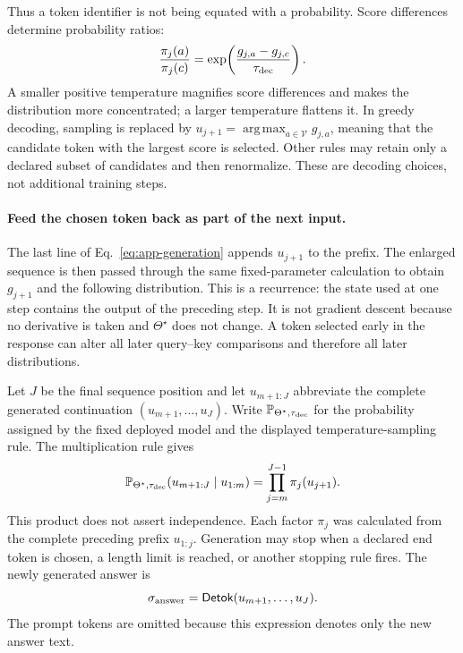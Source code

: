 \documentclass[
  aps,
  reprint,
  superscriptaddress,
  floatfix,
  nofootinbib,
  longbibliography
]{revtex4-2}
\newcommand{\Prob}{\mathbb{P}}
\DeclareMathOperator*{\argmax}{arg\,max}
\begin{document}
Thus a token identifier is not being equated with a probability.  Score
differences determine probability ratios:
\begin{equation}
\label{eq:app-temperature-ratio}
\frac{\pi_j(a)}{\pi_j(c)}
=\exp\!\left(
\frac{g_{j,a}-g_{j,c}}{\tau_{\rm dec}}
\right).
\end{equation}
A smaller positive temperature magnifies score differences and makes the
distribution more concentrated; a larger temperature flattens it.  In greedy
decoding, sampling is replaced by
$u_{j+1}=\argmax_{a\in\mathcal V}g_{j,a}$, meaning that the candidate token with
the largest score is selected.  Other rules may retain only a
declared subset of candidates and then renormalize.  These are decoding choices,
not additional training steps.

\paragraph{Feed the chosen token back as part of the next input.}
The last line of Eq.~\eqref{eq:app-generation} appends $u_{j+1}$ to the prefix.
The enlarged sequence is then passed through the same fixed-parameter
calculation to obtain $g_{j+1}$ and the following distribution.  This is a
recurrence: the state used at one step contains the output of the preceding
step.  It is not gradient descent because no derivative is taken and
$\Theta^\star$ does not change.  A token selected early in the response can
alter all later query--key comparisons and therefore all later distributions.

Let $J$ be the final sequence position and let $u_{m+1:J}$ abbreviate the
complete generated continuation $(u_{m+1},\ldots,u_J)$.  Write
$\Prob_{\Theta^\star,\tau_{\rm dec}}$ for the probability assigned by the fixed
deployed model and the displayed temperature-sampling rule.  The multiplication
rule gives
\begin{equation}
\label{eq:app-generation-chain}
\Prob_{\Theta^\star,\tau_{\rm dec}}
(u_{m+1:J}\mid u_{1:m})
=\prod_{j=m}^{J-1}\pi_j(u_{j+1}).
\end{equation}
This product does not assert independence.  Each factor $\pi_j$ was calculated
from the complete preceding prefix $u_{1:j}$.  Generation may stop when a
declared end token is chosen, a length limit is reached, or another stopping
rule fires.  The newly generated answer is
\begin{equation}
\label{eq:app-detokenization}
\sigma_{\rm answer}
=\mathsf{Detok}(u_{m+1},\ldots,u_J).
\end{equation}
The prompt tokens are omitted because this expression denotes only the new
answer text.
\end{document}
